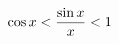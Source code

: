 \documentclass[preview]{standalone}
\begin{document}
\begin{align*}
\special{dvisvgm:raw <g id='unique000'>}\cos x<\frac{\sin x}{x}<1\special{dvisvgm:raw </g>}
\end{align*}
\end{document}
